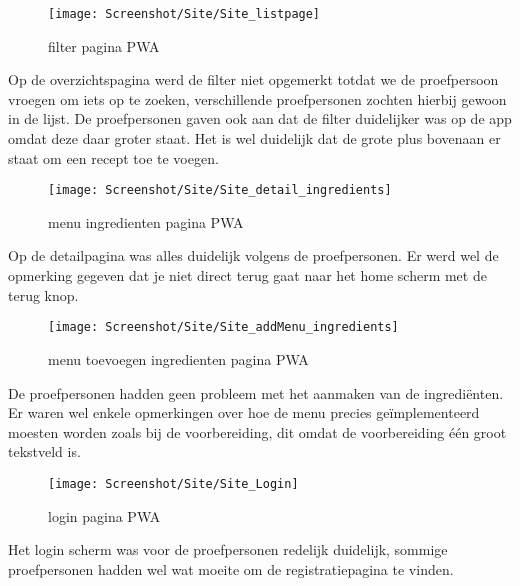 \begin{figure}[H]
	\texttt{[image: Screenshot/Site/Site\_listpage]}\centering
	\caption{filter pagina PWA}
\end{figure}
Op de overzichtspagina werd de filter niet opgemerkt totdat we de proefpersoon vroegen om iets op te zoeken, verschillende proefpersonen zochten hierbij gewoon in de lijst. De proefpersonen gaven ook aan dat de filter duidelijker was op de app omdat deze daar groter staat. Het is wel duidelijk dat de grote plus bovenaan er staat om een recept toe te voegen.

\begin{figure}[H]
	\texttt{[image: Screenshot/Site/Site\_detail\_ingredients]}\centering
	\caption{menu ingredienten pagina PWA}
\end{figure}
Op de detailpagina was alles duidelijk volgens de proefpersonen. Er werd wel de opmerking gegeven dat je niet direct terug gaat naar het home scherm met de terug knop.

\begin{figure}[H]
	\texttt{[image: Screenshot/Site/Site\_addMenu\_ingredients]}\centering
	\caption{menu toevoegen ingredienten pagina PWA}
\end{figure}
De proefpersonen hadden geen probleem met het aanmaken van de ingrediënten. Er waren wel enkele opmerkingen over hoe de menu precies geïmplementeerd moesten worden zoals bij de voorbereiding, dit omdat de voorbereiding één groot tekstveld is.

\begin{figure}[H]
	\texttt{[image: Screenshot/Site/Site\_Login]}\centering
	\caption{login pagina PWA}
\end{figure}
Het login scherm was voor de proefpersonen redelijk duidelijk, sommige proefpersonen hadden wel wat moeite om de registratiepagina te vinden.